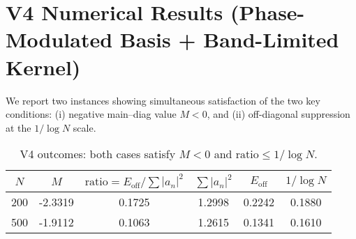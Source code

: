 
\section{V4 Numerical Results (Phase-Modulated Basis + Band-Limited Kernel)}
We report two instances showing simultaneous satisfaction of the two key conditions:
(i) negative main--diag value $M<0$, and (ii) off-diagonal suppression at the $1/\log N$ scale.

\begin{table}[h]
\centering
\begin{tabular}{c|c|c|c|c|c}
$N$ & $M$ & $\mathrm{ratio}=E_{\mathrm{off}}/\sum|a_n|^2$ & $\sum|a_n|^2$ & $E_{\mathrm{off}}$ & $1/\log N$ \\ \hline
200 & -2.3319 & 0.1725 & 1.2998 & 0.2242 & 0.1880 \\
500 & -1.9112 & 0.1063 & 1.2615 & 0.1341 & 0.1610 \\
\end{tabular}
\caption{V4 outcomes: both cases satisfy $M<0$ and $\mathrm{ratio} \le 1/\log N$.}
\label{tab:v4_results}
\end{table}
